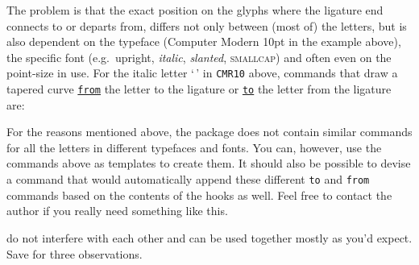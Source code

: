 \documentclass[a4paper,justified]{tufte-handout}
\newcommand{\lm}{\fontfamily{cmr}\selectfont}
\begin{document}
\noindent The problem is that the exact position on the glyphs where the ligature end connects to or departs from, differs not only between (most of) the letters, but is also dependent on the typeface ({\lm Computer Modern 10pt} in the example above), the specific font (e.g.~{\lm upright}, {\lm \textit{italic}}, {\lm \textsl{slanted}}, {\lm \textsc{smallcap}}) and often even on the point-size in use. For the italic letter `\kern0.4pt{\lm\textit{l}}\,' in \texttt{CMR10} above, commands that draw a tapered curve \uline{\texttt{from}} the letter to the ligature or \uline{\texttt{to}} the letter from the ligature are:\medskip

\noindent{}\medskip

For the reasons mentioned above, the package does not contain similar commands for all the letters in different typefaces and fonts. You can, however, use the commands above as templates to create them. It should also be possible to devise a command that would automatically append these different \texttt{to} and \texttt{from} commands based on the contents of the hooks as well. Feel free to contact the author if you really need something like this.

 do not interfere with each other and can be used together mostly as you'd expect. Save for three observations.
\end{document}
